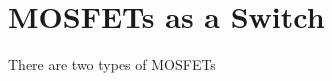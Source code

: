 \documentclass{article}
\theoremstyle{remark}
\begin{document}
\section{MOSFETs as a Switch}

There are two types of MOSFETs
\end{document}
